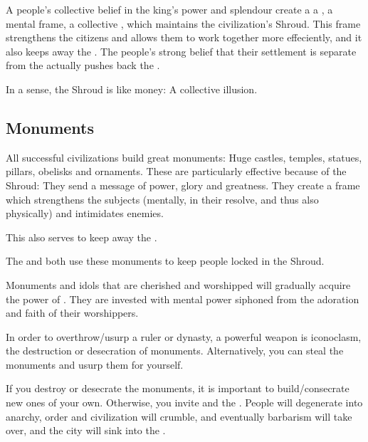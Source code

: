 
A people's collective belief in the king's power and splendour create a a , a mental frame, a collective \vertex, which maintains the civilization's Shroud. 
This frame strengthens the citizens and allows them to work together more effeciently, and it also keeps away the \Wylde{}. 
The people's strong belief that their settlement is separate from the \Wylde{} actually pushes back the \Wylde{}.

In a sense, the Shroud is like money: 
A collective illusion. 









\subsection{Monuments}
All successful civilizations build great monuments: Huge castles, temples, statues, pillars, obelisks and ornaments. These are particularly effective because of the Shroud: They send a message of power, glory and greatness. They create a frame which strengthens the subjects (mentally, in their resolve, and thus also physically) and intimidates enemies. 

This also serves to keep away the \Wylde{}.

The  and  both use these monuments to keep people locked in the Shroud.

Monuments and idols that are cherished and worshipped will gradually acquire the power of \nexi. They are invested with mental power siphoned from the adoration and faith of their worshippers.

In order to overthrow/usurp a ruler or dynasty, a powerful weapon is iconoclasm, the destruction or desecration of monuments. Alternatively, you can steal the monuments and usurp them for yourself. 

If you destroy or desecrate the monuments, it is important to build/consecrate new ones of your own. Otherwise, you invite  and the \Wylde{}. People will degenerate into anarchy, order and civilization will crumble, and eventually barbarism will take over, and the city will sink into the \Wylde{}.


